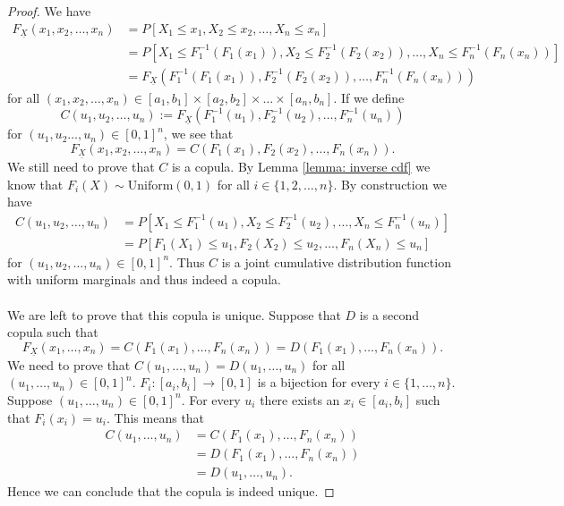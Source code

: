 \documentclass{article}
\begin{document}
\begin{proof}
    We have
    \begin{align*}
        F_{\underline{X}}(x_1,x_2,\dots,x_n) &= P[X_1 \leq x_1,X_2 \leq x_2,\dots, X_n\leq x_n]\\
        &=P[X_1 \leq F_1^{-1}(F_1(x_1)), X_2 \leq F_2^{-1}(F_2(x_2)), \dots , X_n \leq F_n^{-1}(F_n(x_n))]\\
        &= F_{\underline{X}}(F_1^{-1}(F_1(x_1)), F_2^{-1}(F_2(x_2)),\dots, F_n^{-1}(F_n(x_n)))
    \end{align*}
    for all $(x_1,x_2,\dots,x_n)\in[a_1,b_1]\times[a_2,b_2]\times \dots\times [a_n,b_n]$. If we define 
    $$C(u_1,u_2,\dots,u_n) := F_{\underline{X}}(F_1^{-1}(u_1), F_2^{-1}(u_2),\dots,F_n^{-1}(u_n))$$ 
    for $(u_1,u_2\dots,u_n)\in [0,1]^n$, we see that 
    $$F_{\underline{X}}(x_1,x_2,\dots,x_n) = C(F_1(x_1),F_2(x_2),\dots,F_n(x_n)).$$
    We still need to prove that $C$ is a copula. By Lemma \ref{lemma: inverse cdf} we know that $F_i(X)\sim \text{Uniform}(0,1)$ for all $i\in \{1,2,\dots,n\}$. By construction we have 
    \begin{align*}
        C(u_1,u_2,\dots,u_n) &= P[X_1 \leq F_1^{-1}(u_1), X_2 \leq F_2^{-1}(u_2), \dots , X_n \leq F_n^{-1}(u_n)]\\
        &= P[F_1(X_1) \leq u_1, F_2(X_2) \leq u_2, \dots , F_n(X_n) \leq u_n]
    \end{align*}
    for $(u_1,u_2,\dots,u_n)\in [0,1]^n$. Thus $C$ is a joint cumulative distribution function with uniform marginals and thus indeed a copula.\\\\
    We are left to prove that this copula is unique. Suppose that $D$ is a second copula such that 
    $$F_{\underline{X}}(x_1,\dots,x_n) = C(F_1(x_1),\dots,F_n(x_n)) = D(F_1(x_1),\dots,F_n(x_n)).$$
    We need to prove that $C(u_1,\dots,u_n) = D(u_1,\dots,u_n)$ for all $(u_1, \dots,u_n)\in [0,1]^n$. $F_i:[a_i,b_i]\rightarrow [0,1]$ is a bijection for every $i\in \{1,\dots,n\}$. Suppose $(u_1,\dots,u_n)\in [0,1]^n$. For every $u_i$ there exists an $x_i\in [a_i,b_i]$ such that $F_i(x_i) = u_i$. This means that
    \begin{align*}
        C(u_1,\dots,u_n) &= C(F_1(x_1),\dots,F_n(x_n))\\
        &= D(F_1(x_1),\dots,F_n(x_n))\\
        &= D(u_1,\dots,u_n).
    \end{align*}
    Hence we can conclude that the copula is indeed unique.
\end{proof}
\end{document}
